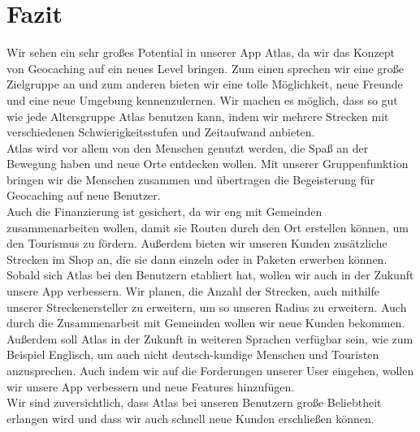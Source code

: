 \documentclass[a4paper, 12pt]{article}
\begin{document}
\section{Fazit}
Wir sehen ein sehr großes Potential in unserer App Atlas, da wir das Konzept von Geocaching auf ein neues Level bringen. Zum einen sprechen wir eine große Zielgruppe an und zum anderen bieten wir eine tolle Möglichkeit, neue Freunde und eine neue Umgebung kennenzulernen. Wir machen es möglich, dass so gut wie jede Altersgruppe Atlas benutzen kann, indem wir mehrere Strecken mit verschiedenen Schwierigkeitsstufen und Zeitaufwand anbieten.\\
Atlas wird vor allem von den Menschen genutzt werden, die Spaß an der Bewegung haben und neue Orte entdecken wollen. Mit unserer Gruppenfunktion bringen wir die Menschen zusammen und übertragen die Begeisterung für Geocaching auf neue Benutzer.\\
Auch die Finanzierung ist gesichert, da wir eng mit Gemeinden zusammenarbeiten wollen, damit sie Routen durch den Ort erstellen können, um den Tourismus zu fördern. Außerdem bieten wir unseren Kunden zusätzliche Strecken im Shop an, die sie dann einzeln oder in Paketen erwerben können.\\
Sobald sich Atlas bei den Benutzern etabliert hat, wollen wir auch in der Zukunft unsere App verbessern. Wir planen, die Anzahl der Strecken, auch mithilfe unserer Streckenersteller zu erweitern, um so unseren Radius zu erweitern. Auch durch die Zusammenarbeit mit Gemeinden wollen wir neue Kunden bekommen. Außerdem soll Atlas in der Zukunft in weiteren Sprachen verfügbar sein, wie zum Beispiel Englisch, um auch nicht deutsch-kundige Menschen und Touristen anzusprechen. Auch indem wir auf die Forderungen unserer User eingehen, wollen wir unsere App verbessern und neue Features hinzufügen.\\
Wir sind zuversichtlich, dass Atlas bei unseren Benutzern große Beliebtheit erlangen wird und dass wir auch schnell neue Kunden erschließen können.\\
\end{document}
